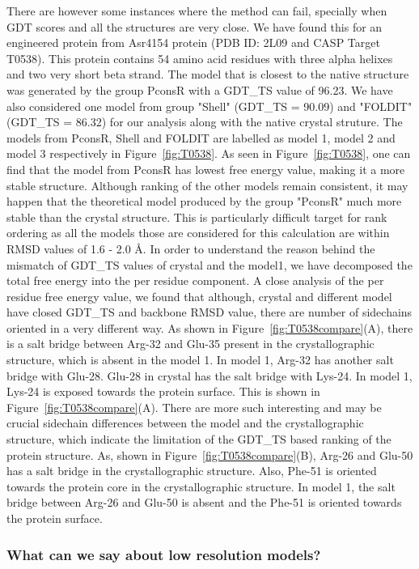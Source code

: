 \documentclass[12pt]{article}
\begin{document}
There are however some instances where the method can fail, specially when GDT scores and all the structures are
very close. We have found this for an engineered protein from Asr4154 protein (PDB ID: 2L09 and CASP Target T0538).
This protein contains 54 amino acid residues with three alpha helixes and two very short beta strand. 
The model that is closest to the native structure was generated by the group PconsR with a GDT\_TS value of 96.23.
We have also considered one model from group "Shell" (GDT\_TS = 90.09) and "FOLDIT" (GDT\_TS = 86.32) for our analysis along with
the native crystal struture. The models from PconsR, Shell and FOLDIT are labelled as model 1, model 2 and model 3 
respectively in Figure~\ref{fig:T0538}. As seen in Figure~\ref{fig:T0538}, one can find that the 
model from PconsR has lowest free energy value, making it a more stable structure. Although ranking of the other models
remain consistent, it may happen that the theoretical model produced by the group "PconsR" much more stable than the 
crystal structure. This is particularly difficult target for rank ordering as all the models those are considered for this 
calculation are within RMSD values of 1.6 - 2.0 \AA. In order to understand the reason behind the mismatch of GDT\_TS values
of crystal and the model1, we have decomposed the total free energy into the per residue component. A close analysis of 
the per residue free energy value, we found that although, crystal and different model have closed GDT\_TS and backbone RMSD 
value, there are number of sidechains oriented in a very different way. As shown in Figure~\ref{fig:T0538compare}(A),
there is a salt bridge between Arg-32 and Glu-35 present in the crystallographic structure, which is absent in the
model 1. In model 1, Arg-32 has another salt bridge with Glu-28. Glu-28 in crystal has the salt bridge with Lys-24. In model 1, Lys-24 is
exposed towards the protein surface. This is shown in Figure~\ref{fig:T0538compare}(A). There are more such interesting and may be crucial
sidechain differences between the model and the crystallographic structure, which indicate the limitation of the GDT\_TS based 
ranking of the protein structure. As, shown in Figure~\ref{fig:T0538compare}(B), Arg-26 and Glu-50 has a salt bridge in the crystallographic 
structure. Also, Phe-51 is oriented towards the protein core in the crystallographic structure. In model 1, the salt bridge between Arg-26 and Glu-50
is absent and the Phe-51 is oriented towards the protein surface.   

\subsubsection{What can we say about low resolution models?}
\end{document}
